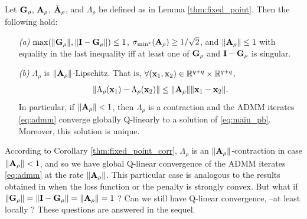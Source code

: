 \begin{corollary}
  Let $\mathbf{G}_{\rho}$, $\mathbf{A}_{\rho}$, $\tilde{\mathbf{A}}_{\rho}$, and $\Lambda_\rho$ be
  defined as in Lemma \ref{thm:fixed_point}. 
  Then the following hold:
  \begin{itemize}
    \item[\textit{(a)}] $\max(\|\mathbf{G}_\rho\|,
      \|\mathbf{I}-\mathbf{G}_{\rho}\|) \le 1$,
      $\sigma_{\min^*}(\mathbf{A}_\rho) \ge 1/\sqrt{2}$, and $\|\mathbf{A}_{\rho}\| \le 1$
      with equality in the last inequality iff at least one of $\mathbf{G}_\rho$
      and $\mathbf{I}-\mathbf{G}_\rho$ is singular.
\item[\textit{(b)}] $\Lambda_\rho$ is $\|\mathbf{A}_\rho\|$-Lipschitz. That is,
  $\forall (\mathbf{x}_1, \mathbf{x}_2) \in \mathbb{R}^{q+q} \times \mathbb{R}^{q+q}$,
\begin{eqnarray}
  \|\Lambda_{\rho}(\mathbf{x}_1) - \Lambda_\rho(\mathbf{x}_2)\| \le
  \|\mathbf{A}_\rho\|\|\mathbf{x}_1 - \mathbf{x}_2\|.
  \label{eq:tight}
\end{eqnarray}
 In particular, if $\|\mathbf{A}_\rho\| < 1$,
  then $\Lambda_\rho$ is a contraction and the ADMM
  iterates \eqref{eq:admm} converge globally Q-linearly to a
  solution of \eqref{eq:main_pb}. Moreover, this solution is unique.
  \end{itemize}
\label{thm:fixed_point_corr}
\end{corollary}

According to Corollary \ref{thm:fixed_point_corr}, $\Lambda_\rho$ is an
$\|\mathbf{A}_\rho\|$-contraction in case $\|\mathbf{A}_\rho\| < 1$, and so we have
global Q-linear convergence of the ADMM iterates \eqref{eq:admm} at the
rate $\|\mathbf{A}_\rho\|$. This particular case is analogous to the results
obtained in \citep{nishihara2015general} when the loss function or the
penalty is strongly convex.
But what if $\|\mathbf{G}_\rho\| = \|\mathbf{I}-\mathbf{G}_\rho\| =
\|\mathbf{A}_\rho\| = 1$ ? Can we still have Q-linear convergence, --at
least locally ? These questions are answered in the sequel.

